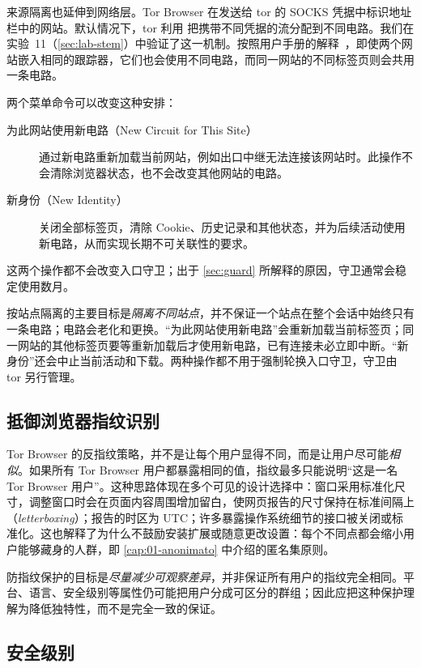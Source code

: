 来源隔离也延伸到网络层。Tor Browser 在发送给 tor 的 SOCKS 凭据中标识地址栏中的网站。默认情况下，tor 利用  把携带不同凭据的流分配到不同电路。我们在实验~11（\cref{sec:lab-stem}）中验证了这一机制。按照用户手册的解释~\cite{tbmanual}，即使两个网站嵌入相同的跟踪器，它们也会使用不同电路，而同一网站的不同标签页则会共用一条电路。

两个菜单命令可以改变这种安排：
\begin{description}
  \item[为此网站使用新电路（New Circuit for This Site）] 通过新电路重新加载当前网站，例如出口中继无法连接该网站时。此操作不会清除浏览器状态，也不会改变其他网站的电路。
  \item[新身份（New Identity）] 关闭全部标签页，清除 Cookie、历史记录和其他状态，并为后续活动使用新电路，从而实现长期不可关联性的要求。
\end{description}
这两个操作都不会改变入口守卫；出于 \cref{sec:guard} 所解释的原因，守卫通常会稳定使用数月。

按站点隔离的主要目标是\emph{隔离不同站点}，并不保证一个站点在整个会话中始终只有一条电路；电路会老化和更换。“为此网站使用新电路”会重新加载当前标签页；同一网站的其他标签页要等重新加载后才使用新电路，已有连接未必立即中断。“新身份”还会中止当前活动和下载。两种操作都不用于强制轮换入口守卫，守卫由 tor 另行管理。

\subsection{抵御浏览器指纹识别}

Tor Browser 的反指纹策略，并不是让每个用户显得不同，而是让用户尽可能\emph{相似}。如果所有 Tor Browser 用户都暴露相同的值，指纹最多只能说明\enquote{这是一名 Tor Browser 用户}。这种思路体现在多个可见的设计选择中：窗口采用标准化尺寸，调整窗口时会在页面内容周围增加留白，使网页报告的尺寸保持在标准间隔上（\emph{letterboxing}）；报告的时区为 UTC；许多暴露操作系统细节的接口被关闭或标准化。这也解释了为什么不鼓励安装扩展或随意更改设置：每个不同点都会缩小用户能够藏身的人群，即 \cref{cap:01-anonimato} 中介绍的匿名集原则。

防指纹保护的目标是\emph{尽量减少可观察差异}，并非保证所有用户的指纹完全相同。平台、语言、安全级别等属性仍可能把用户分成可区分的群组；因此应把这种保护理解为降低独特性，而不是完全一致的保证。

\subsection{安全级别}

